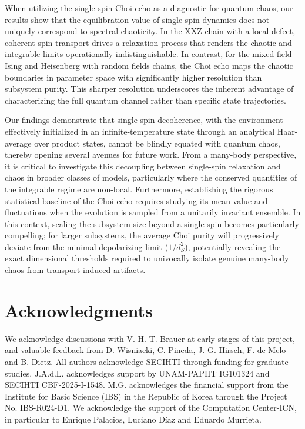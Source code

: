 \documentclass[pra,twocolumn,aps,showpacs,superscriptaddress,longbibliography]{revtex4-2}%
\begin{document}
When utilizing the single-spin Choi echo as a diagnostic for quantum chaos, our results show that the equilibration value of single-spin dynamics does not uniquely correspond to spectral chaoticity. In the XXZ chain with a local defect, coherent spin transport drives a relaxation process that renders the chaotic and integrable limits operationally indistinguishable. In contrast, for the mixed-field Ising and Heisenberg with random fields chains, the Choi echo maps the chaotic boundaries in parameter space with significantly higher resolution than subsystem purity. This sharper resolution underscores the inherent advantage of characterizing the full quantum channel rather than specific state trajectories.

Our findings demonstrate that single-spin decoherence, with the environment effectively initialized in an infinite-temperature state through an analytical Haar-average over product states, cannot be blindly equated with quantum chaos, thereby opening several avenues for future work. From a many-body perspective, it is critical to investigate this decoupling between single-spin relaxation and chaos in broader classes of models, particularly where the conserved quantities of the integrable regime are non-local. Furthermore, establishing the rigorous statistical baseline of the Choi echo requires studying its mean value and fluctuations when the evolution is sampled from a unitarily invariant ensemble. In this context, scaling the subsystem size beyond a single spin becomes particularly compelling; for larger subsystems, the average Choi purity will progressively deviate from the minimal depolarizing limit ($1/d_S^2$), potentially revealing the exact dimensional thresholds required to univocally isolate genuine many-body chaos from transport-induced artifacts.


\section*{Acknowledgments}
We acknowledge discussions with V. H. T. Brauer at early stages of this project, and valuable feedback from D. Wisniacki, C. Pineda, J. G. Hirsch, F. de Melo and B. Dietz.
All authors acknowledge SECIHTI through funding for graduate studies.
J.A.d.L. acknowledges support by UNAM-PAPIIT IG101324 and SECIHTI CBF-2025-I-1548. M.G. acknowledges the financial support from the Institute for Basic Science (IBS) in the Republic of Korea through the Project No. IBS-R024-D1. We acknowledge the support of the Computation Center-ICN, in particular to Enrique Palacios, Luciano Díaz and Eduardo Murrieta.



%

\appendix
% 


% 

\end{document}
